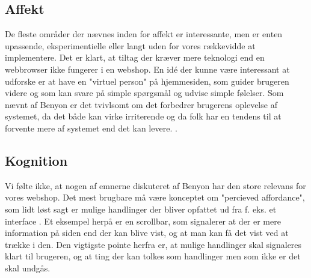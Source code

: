 \subsection{Affekt}
De fleste områder der nævnes inden for affekt er interessante, men er enten upassende, eksperimentielle eller langt uden for vores rækkevidde at
implementere. Det er klart, at tiltag der kræver mere teknologi end en webbrowser ikke fungerer i en webshop. En idé der kunne være interessant
at udforske er at have en "virtuel person" på hjemmesiden, som guider brugeren videre og som kan svare på simple spørgsmål og udvise simple følelser.
Som nævnt af Benyon er det tvivlsomt om det forbedrer brugerens oplevelse af systemet, da det både kan virke irriterende og da folk har en tendens
til at forvente mere af systemet end det kan levere. \cite[s. 571]{Benyon2010}.

\subsection{Kognition}
Vi følte ikke, at nogen af emnerne diskuteret af Benyon har den store relevans for vores webshop. Det mest brugbare må være konceptet om
"percieved affordance", som lidt løst sagt er mulige handlinger der bliver opfattet ud fra f. eks. et interface \cite[s.588]{Benyon2010}. Et
eksempel herpå er en scrollbar, som signalerer at der er mere information på siden end der kan blive vist, og at man kan få det vist ved at
trække i den. Den vigtigste pointe herfra er, at mulige handlinger skal signaleres klart til brugeren, og at ting der kan tolkes som handlinger
men som ikke er det skal undgås.

